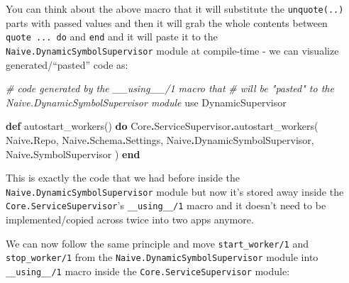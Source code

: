 \documentclass[
  oneside]{book}
\newenvironment{Shaded}{\begin{snugshade}}{\end{snugshade}}
\newcommand{\CommentTok}[1]{\textcolor[rgb]{0.56,0.35,0.01}{\textit{#1}}}
\newcommand{\ConstantTok}[1]{\textcolor[rgb]{0.00,0.00,0.00}{#1}}
\newcommand{\ImportTok}[1]{#1}
\newcommand{\KeywordTok}[1]{\textcolor[rgb]{0.13,0.29,0.53}{\textbf{#1}}}
\newcommand{\NormalTok}[1]{#1}
\newcommand{\OperatorTok}[1]{\textcolor[rgb]{0.81,0.36,0.00}{\textbf{#1}}}
\begin{document}
You can think about the above macro that it will substitute the \texttt{unquote(..)} parts with passed values and then it will grab the whole contents between \texttt{quote\ ...\ do} and \texttt{end} and it will paste it to the \texttt{Naive.DynamicSymbolSupervisor} module at compile-time - we can visualize generated/``pasted'' code as:

\begin{Shaded}
\begin{Highlighting}[]
  \CommentTok{\# code generated by the \textasciigrave{}\_\_using\_\_/1\textasciigrave{} macro that}
  \CommentTok{\# will be "pasted" to the \textasciigrave{}Naive.DynamicSymbolSupervisor\textasciigrave{} module}
  \ImportTok{use} \ConstantTok{DynamicSupervisor}

  \KeywordTok{def}\NormalTok{ autostart\_workers() }\KeywordTok{do}
    \ConstantTok{Core}\OperatorTok{.}\ConstantTok{ServiceSupervisor}\OperatorTok{.}\NormalTok{autostart\_workers(}
      \ConstantTok{Naive}\OperatorTok{.}\ConstantTok{Repo}\NormalTok{,}
      \ConstantTok{Naive}\OperatorTok{.}\ConstantTok{Schema}\OperatorTok{.}\ConstantTok{Settings}\NormalTok{,}
      \ConstantTok{Naive}\OperatorTok{.}\ConstantTok{DynamicSymbolSupervisor}\NormalTok{,}
      \ConstantTok{Naive}\OperatorTok{.}\ConstantTok{SymbolSupervisor}
\NormalTok{    )}
  \KeywordTok{end}
\end{Highlighting}
\end{Shaded}

This is exactly the code that we had before inside the \texttt{Naive.DynamicSymbolSupervisor} module but now it's stored away inside the \texttt{Core.ServiceSupervisor}'s \texttt{\_\_using\_\_/1} macro and it doesn't need to be implemented/copied across twice into two apps anymore.

We can now follow the same principle and move \texttt{start\_worker/1} and \texttt{stop\_worker/1} from the \texttt{Naive.DynamicSymbolSupervisor} module into \texttt{\_\_using\_\_/1} macro inside the \texttt{Core.ServiceSupervisor} module:
\end{document}
